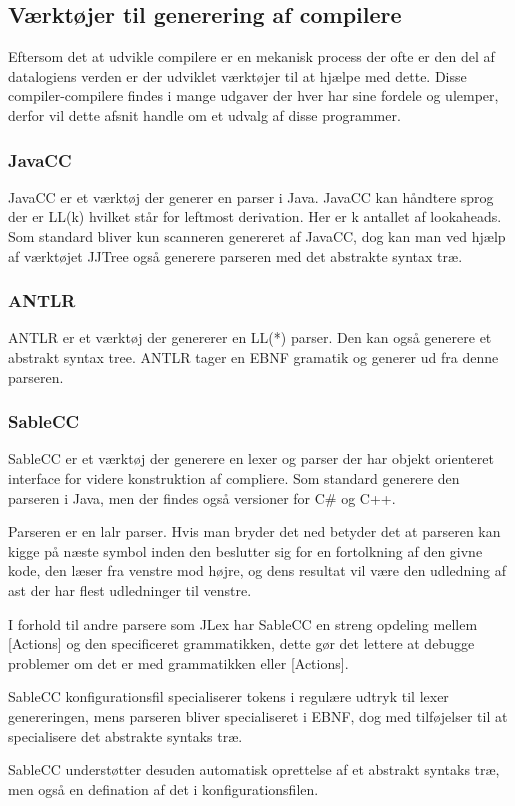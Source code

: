 \subsection{Værktøjer til generering af compilere}
\label{ssec:toolsforcc}

Eftersom det at udvikle compilere er en mekanisk process der ofte er den del af datalogiens verden er der udviklet værktøjer til at hjælpe med dette. Disse compiler-compilere findes i mange udgaver der hver har sine fordele og ulemper, derfor vil dette afsnit handle om et udvalg af disse programmer.

\subsubsection{JavaCC}
JavaCC er et værktøj der generer en parser i Java. JavaCC kan håndtere sprog der er LL(k) hvilket står for leftmost derivation. Her er k antallet af lookaheads. Som standard bliver kun scanneren genereret af JavaCC, dog kan man ved hjælp af værktøjet JJTree også generere parseren med det abstrakte syntax træ.

\subsubsection{ANTLR}
ANTLR er et værktøj der genererer en LL(*) parser. Den kan også generere et abstrakt syntax tree. ANTLR tager en EBNF gramatik og generer ud fra denne parseren.

\subsubsection{SableCC}
SableCC er et værktøj der generere en lexer og parser der har objekt orienteret interface for videre konstruktion af compliere. Som standard generere den parseren i Java, men der findes også versioner for C\# og C++.
    
    
Parseren er en \gls{lalr} parser. Hvis man bryder det ned betyder det at parseren kan kigge på næste symbol inden den beslutter sig for en fortolkning af den givne kode, den læser fra venstre mod højre, og dens resultat vil være den udledning af \gls{ast} der har flest udledninger til venstre.
    
I forhold til andre parsere som JLex har SableCC en streng opdeling mellem [Actions] og den specificeret grammatikken, dette gør det lettere at debugge problemer om det er med grammatikken eller [Actions].

SableCC konfigurationsfil specialiserer tokens i regulære udtryk til lexer genereringen, mens parseren bliver specialiseret i EBNF, dog med tilføjelser til at specialisere det abstrakte syntaks træ.

SableCC understøtter desuden automatisk oprettelse af et abstrakt syntaks træ, men også en defination af det i konfigurationsfilen.
